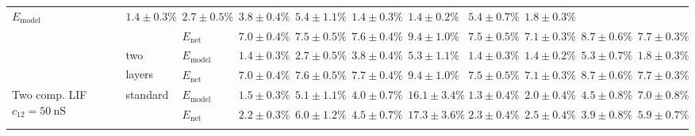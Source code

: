\begin{sidewaystable}
\begin{tabular}{p{2.2cm} p{1.7cm} l r r r r r r r r }
	$E_\mathrm{model}$ & 
	\color{Gray}$1.4 \pm 0.3\%$ & \color{Gray}$2.7 \pm 0.5\%$ & \color{Gray}$3.8 \pm 0.4\%$ & \color{Gray}$5.4 \pm 1.1\%$ & \color{Gray}$1.4 \pm 0.3\%$ & \color{Gray}$1.4 \pm 0.2\%$ & \color{Gray}$5.4 \pm 0.7\%$ & \color{Gray}$1.8 \pm 0.3\%$
	\\
	& & 
	$E_\mathrm{net}$ &
	\cellcolor{White!50!SteelBlue}$7.0 \pm 0.4\%$ & \cellcolor{White!75!SteelBlue}$7.5 \pm 0.5\%$ & \cellcolor{White!50!SteelBlue}$7.6 \pm 0.4\%$ & \cellcolor{White!94!SteelBlue}$9.4 \pm 1.0\%$ & \cellcolor{White!50!SteelBlue}$7.5 \pm 0.5\%$ & \cellcolor{White!44!SteelBlue}$7.1 \pm 0.3\%$ & \cellcolor{White!44!SteelBlue}$8.7 \pm 0.6\%$ & \cellcolor{White!44!SteelBlue}$7.7 \pm 0.3\%$
	\\\cmidrule(l){2-11}
	&
	\multirow{2}{1.7cm}{\raggedleft two layers\textsuperscript{\dag}} &
	$E_\mathrm{model}$ & 
	\color{Gray}$1.4 \pm 0.3\%$ & \color{Gray}$\mathbf{2.7 \pm 0.5\%}$ & \color{Gray}$3.8 \pm 0.4\%$ & \color{Gray}$\mathbf{5.3 \pm 1.1\%}$ & \color{Gray}$1.4 \pm 0.3\%$ & \color{Gray}$\mathbf{1.4 \pm 0.2\%}$ & \color{Gray}$5.3 \pm 0.7\%$ & \color{Gray}$\mathbf{1.8 \pm 0.3\%}$
	\\
	& & 
	$E_\mathrm{net}$ &
	\cellcolor{White!44!SteelBlue}$7.0 \pm 0.4\%$ & \cellcolor{White!69!SteelBlue}$7.6 \pm 0.5\%$ & \cellcolor{White!44!SteelBlue}$7.7 \pm 0.4\%$ & \cellcolor{White!100!SteelBlue}$\mathbf{9.4 \pm 1.0\%}$ & \cellcolor{White!44!SteelBlue}$7.5 \pm 0.5\%$ & \cellcolor{White!38!SteelBlue}$7.1 \pm 0.3\%$ & \cellcolor{White!50!SteelBlue}$8.7 \pm 0.6\%$ & \cellcolor{White!50!SteelBlue}$7.7 \pm 0.3\%$
	\\\midrule
	\multirow{8}{2.2cm}{\raggedleft %
	Two comp. LIF $c_{12} = \SI{50}{\nano\siemens}$} &
	\multirow{2}{1.7cm}{\raggedleft %
	standard} &
	$E_\mathrm{model}$ & 
	\color{Gray}$1.5 \pm 0.3\%$ & \color{Gray}$5.1 \pm 1.1\%$ & \color{Gray}$4.0 \pm 0.7\%$ & \color{Gray}$16.1 \pm 3.4\%$ & \color{Gray}$1.3 \pm 0.4\%$ & \color{Gray}$2.0 \pm 0.4\%$ & \color{Gray}$4.5 \pm 0.8\%$ & \color{Gray}$7.0 \pm 0.8\%$
	\\
	& & 
	$E_\mathrm{net}$ &
	\cellcolor{White!94!SteelBlue}$2.2 \pm 0.3\%$ & \cellcolor{White!94!SteelBlue}$6.0 \pm 1.2\%$ & \cellcolor{White!94!SteelBlue}$4.5 \pm 0.7\%$ & \cellcolor{White!75!SteelBlue}$17.3 \pm 3.6\%$ & \cellcolor{White!94!SteelBlue}$2.3 \pm 0.4\%$ & \cellcolor{White!94!SteelBlue}$2.5 \pm 0.4\%$ & \cellcolor{White!94!SteelBlue}$3.9 \pm 0.8\%$ & \cellcolor{White!88!SteelBlue}$5.9 \pm 0.7\%$
	\\\cmidrule(l){2-11}
	&
	\multirow{2}{1.7cm}{\raggedleft %
}
\end{tabular}
\end{sidewaystable}
